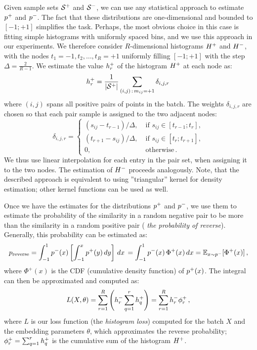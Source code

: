 Given sample sets ${\mathcal S}^{+}$ and ${\mathcal S}^{-}$, we can use any statistical approach to estimate $p^{+}$ and $p^{-}$. The fact that these distributions are one-dimensional and bounded to $[-1;+1]$ simplifies the task. Perhaps, the most obvious choice in this case is fitting simple histograms with uniformly spaced bins, and we use this approach in our experiments. We therefore consider $R$-dimensional histograms $H^{+}$ and $H^{-}$, with the nodes $t_1=-1,t_2,\dots,t_R=+1$ uniformly filling $[-1;+1]$ with the step $\Delta=\frac{2}{R-1}$. We estimate the value $h^{+}_r$ of the histogram $H^{+}$ at each node as:
\begin{equation} \label{eq:hist}
    h^{+}_r = \frac{1}{|{\mathcal S}^{+}|}\sum_{(i,j)\,:\,m_{ij}=+1} \delta_{i,j,r}\, 
\end{equation}
where $(i,j)$ spans all positive pairs of points in the batch. The weights $\delta_{i,j,r}$ are chosen so that each pair sample is assigned to the two adjacent nodes:
\begin{equation} \label{eq:histweight}
\delta_{i,j,r} = \begin{cases} 
    (s_{ij}-t_{r-1})/\Delta,\; &\text{if $s_{ij} \in [t_{r-1};t_r]$},\\
    (t_{r+1}-s_{ij})/\Delta,\; &\text{if $s_{ij} \in [t_r;t_{r+1}]$},\\
    0,\; &\text{otherwise}\,.
    \end{cases}
\end{equation}
 We thus use linear interpolation for each entry in the pair set, when assigning it to the two nodes. The estimation of $H^{-}$ proceeds analogously. Note, that the described approach is equivalent to using ''triangular'' kernel for density estimation; other kernel functions can be used as well. %

Once we have the estimates for the  distributions $p^{+}$ and $p^{-}$, we use them to estimate the probability of the similarity in a random negative pair to be more than the similarity in a random positive pair ( \textit{the probability of reverse}). Generally, this probability can be estimated as:
\begin{equation} \label{eq:reverse}
p_\text{reverse} = \int_{-1}^{1} p^{-}(x) \left[\int_{-1}^x p^{+}(y)\,dy\right]\, dx \, =
\int_{-1}^{1} p^{-}(x)\,\Phi^{+}(x)\, dx = \mathbb{E}_{x \sim p^{-}}[\Phi^{+}(x)]\,,
\end{equation}
where $\Phi^{+}(x)$ is the CDF (cumulative density function) of $p^{+}(x)$. The integral  can then be approximated and computed as:
\begin{equation} \label{eq:loss}
L(X,\theta) = \sum_{r=1}^R \left( h^{-}_r \sum_{q=1}^r h^{+}_q  \right)= \sum_{r=1}^R  h^{-}_r \phi^{+}_r\,,
\end{equation}
where $L$ is our loss function (the \textit{histogram loss}) computed for the batch $X$ and the embedding parameters $\theta$, which approximates the reverse probability; $\phi^{+}_r=\sum_{q=1}^r h^{+}_q$ is the cumulative sum of the histogram $H^{+}$.

